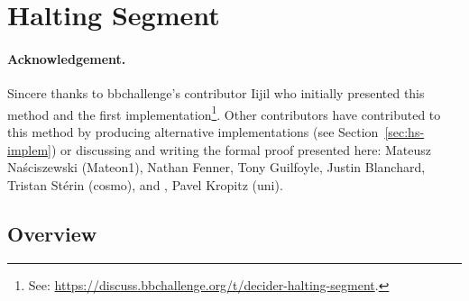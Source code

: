 
\newcommand{\HS}{Halting Segment\xspace}

\section{Halting Segment}\label{sec:halting-segment}

\paragraph{Acknowledgement.} Sincere thanks to bbchallenge's contributor Iijil who initially presented this method and the first implementation\footnote{See: \url{https://discuss.bbchallenge.org/t/decider-halting-segment}.}. Other contributors have contributed to this method by producing alternative implementations (see Section~\ref{sec:hs-implem}) or discussing and writing the formal proof presented here: Mateusz Naściszewski (Mateon1), Nathan Fenner, Tony Guilfoyle, Justin Blanchard, Tristan Stérin (cosmo), and , Pavel Kropitz (uni).

\subsection{Overview}

